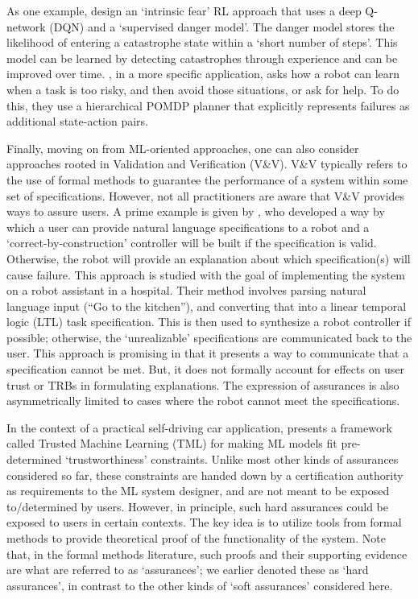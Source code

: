 As one example, \citet{Lipton2016-dq} design an `intrinsic fear' RL approach that uses a deep Q-network (DQN) and a `supervised danger model'. The danger model stores the likelihood of entering a catastrophe state within a `short number of steps'. This model can be learned by detecting catastrophes through experience and can be improved over time. \citet{Curran2016-ij}, in a more specific application, asks how a robot can learn when a task is too risky, and then avoid those situations, or ask for help. To do this, they use a hierarchical POMDP planner that explicitly represents failures as additional state-action pairs.

Finally, moving on from ML-oriented approaches, one can also consider approaches rooted in Validation and Verification (V\&V). V\&V typically refers to the use of formal methods to guarantee the performance of a system within some set of specifications. However, not all practitioners are aware that V\&V provides ways to assure users. A prime example is given by \citet{Raman2013-mz}, who developed a way by which a user can provide natural language specifications to a robot and a `correct-by-construction' controller will be built if the specification is valid. Otherwise, the robot will provide an explanation about which specification(s) will cause failure. This approach is studied with the goal of implementing the system on a robot assistant in a hospital. Their method involves parsing natural language input (``Go to the kitchen''), and converting that into a linear temporal logic (LTL) task specification. This is then used to synthesize a robot controller if possible; otherwise, the `unrealizable' specifications are communicated back to the user. This approach is promising in that it presents a way to communicate that a specification cannot be met. But, it does not formally account for effects on user trust or TRBs in formulating explanations. The expression of assurances is also asymmetrically limited to cases where the robot cannot meet the specifications. 

In the context of a practical self-driving car application, \citet{Ghosh2016-dl} presents a framework called Trusted Machine Learning (TML) for making ML models fit pre-determined `trustworthiness' constraints. Unlike most other kinds of assurances considered so far, these constraints are handed down by a certification authority as requirements to the ML system designer, and are not meant to be exposed to/determined by users. However, in principle, such hard assurances could be exposed to users in certain contexts. The key idea is to utilize tools from formal methods to provide theoretical proof of the functionality of the system. Note that, in the formal methods literature, such proofs and their supporting evidence are what are referred to as `assurances'; we earlier denoted these as `hard assurances', in contrast to the other kinds of `soft assurances' considered here. 

